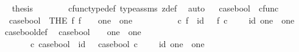 \begin{isabellebody}
\ \isamarkupfalse%
\ {\isacharquery}{\kern0pt}thesis\isanewline
\ \ \ \ \ \ \isamarkupfalse%
\ cfunc{\isacharunderscore}{\kern0pt}type{\isacharunderscore}{\kern0pt}def\ type{\isacharunderscore}{\kern0pt}assms{\isacharparenleft}{\kern0pt}{}{\isacharparenright}{\kern0pt}\ z{\isacharunderscore}{\kern0pt}def\ \isamarkupfalse%
\ auto\isanewline
\ \isamarkupfalse%
\isanewline
{}\isamarkupfalse%
%
\endisatagproof
{\isafoldproof}%
%
\isadelimproof
%
\endisadelimproof
%
\isadelimdocument
%
\endisadelimdocument
%
\isatagdocument
%
\isamarkuptrue%
%
\endisatagdocument
{\isafolddocument}%
%
\isadelimdocument
%
\endisadelimdocument
{}\isamarkupfalse%
\ case{\isacharunderscore}{\kern0pt}bool\ {\isacharcolon}{\kern0pt}{\isacharcolon}{\kern0pt}\ {\isachardoublequoteopen}cfunc{\isachardoublequoteclose}\ \isanewline
\ \ {\isachardoublequoteopen}case{\isacharunderscore}{\kern0pt}bool\ {\isacharequal}{\kern0pt}\ {\isacharparenleft}{\kern0pt}THE\ f{\isachardot}{\kern0pt}\ f\ {\isacharcolon}{\kern0pt}\ {\isasymOmega}\ {\isasymrightarrow}\ {\isacharparenleft}{\kern0pt}one\ {\isasymCoprod}\ one{\isacharparenright}{\kern0pt}\ {\isasymand}\ \ \isanewline
\ \ \ \ {\isacharparenleft}{\kern0pt}{\isasymt}\ {\isasymamalg}\ {\isasymf}{\isacharparenright}{\kern0pt}\ {\isasymcirc}\isactrlsub c\ f\ {\isacharequal}{\kern0pt}\ id\ {\isasymOmega}\ {\isasymand}\ f\ {\isasymcirc}\isactrlsub c\ {\isacharparenleft}{\kern0pt}{\isasymt}\ {\isasymamalg}\ {\isasymf}{\isacharparenright}{\kern0pt}\ {\isacharequal}{\kern0pt}\ id\ {\isacharparenleft}{\kern0pt}one\ {\isasymCoprod}\ one{\isacharparenright}{\kern0pt}{\isacharparenright}{\kern0pt}{\isachardoublequoteclose}\isanewline
\isanewline
{}\isamarkupfalse%
\ case{\isacharunderscore}{\kern0pt}bool{\isacharunderscore}{\kern0pt}def{}{\isacharcolon}{\kern0pt}\isanewline
\ \ {\isachardoublequoteopen}case{\isacharunderscore}{\kern0pt}bool\ {\isacharcolon}{\kern0pt}\ {\isasymOmega}\ {\isasymrightarrow}\ {\isacharparenleft}{\kern0pt}one\ {\isasymCoprod}\ one{\isacharparenright}{\kern0pt}\ {\isasymand}\ \ \isanewline
\ \ \ \ {\isacharparenleft}{\kern0pt}{\isasymt}\ {\isasymamalg}\ {\isasymf}{\isacharparenright}{\kern0pt}\ {\isasymcirc}\isactrlsub c\ case{\isacharunderscore}{\kern0pt}bool\ {\isacharequal}{\kern0pt}\ id\ {\isasymOmega}\ {\isasymand}\ case{\isacharunderscore}{\kern0pt}bool\ {\isasymcirc}\isactrlsub c\ {\isacharparenleft}{\kern0pt}{\isasymt}\ {\isasymamalg}\ {\isasymf}{\isacharparenright}{\kern0pt}\ {\isacharequal}{\kern0pt}\ id\ {\isacharparenleft}{\kern0pt}one\ {\isasymCoprod}\ one{\isacharparenright}{\kern0pt}{\isachardoublequoteclose}\isanewline

\end{isabellebody}
